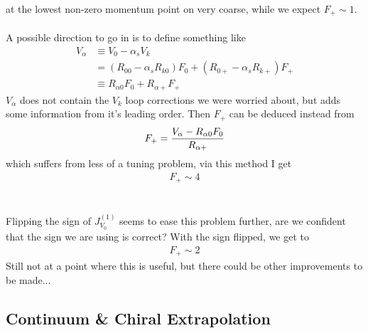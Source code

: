 \documentclass[a4paper,10pt]{article}
\numberwithin{equation}{section}
\begin{document}
at the lowest non-zero momentum point on very coarse, while we expect $F_+ \sim 1$.
\\ \\
A possible direction to go in is to define something like
\begin{align}
        \nonumber
        V_{\alpha} &\equiv V_0 - \alpha_s V_k \\
        &= (R_{00} - \alpha_s R_{k0} )F_0 + (R_{0+}-\alpha_s R_{k+})F_+ \\
        \nonumber
        &\equiv R_{\alpha 0} F_0 + R_{\alpha +} F_+
\end{align}
$V_{\alpha}$ does not contain the $V_k$ loop corrections we were worried about, but adds some information from it's leading order. Then $F_+$ can be deduced instead from
\begin{align}
        F_+ = {V_{\alpha} - R_{\alpha 0} F_0 \over R_{\alpha +}}
\end{align}
which suffers from less of a tuning problem, via this method I get
\begin{align}
        F_+ \sim 4
\end{align}
\\ \\
Flipping the sign of $J_{V_0}^{(1)}$ seems to ease this problem further, are we confident that the sign we are using is correct? With the sign flipped, we get to
\begin{align}
        F_+ \sim 2
\end{align}
Still not at a point where this is useful, but there could be other improvements to be made...

\subsection{Continuum \& Chiral Extrapolation}
\end{document}
